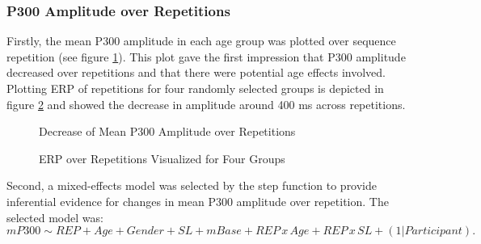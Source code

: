 \subsubsection{P300 Amplitude over Repetitions}
Firstly, the mean P300 amplitude in each age group was plotted over sequence repetition (see figure \ref{fig:KI_LI}). This plot gave the first impression that P300 amplitude decreased over repetitions and that there were potential age effects involved. Plotting ERP of repetitions for four randomly selected groups is depicted in figure \ref{fig:erp_rep} and showed the decrease in amplitude around 400 ms across repetitions. 
\begin{figure}[H]
    \centering  
       
    \caption{Decrease of Mean P300 Amplitude over Repetitions}
    \label{fig:KI_LI}
\end{figure}
\begin{figure}[H]
    \centering
       
    \caption{ERP over Repetitions Visualized for Four Groups}
    \label{fig:erp_rep}
\end{figure}

Second, a mixed-effects model was selected by the step function to provide inferential evidence for changes in mean P300 amplitude over repetition. The selected model was: 
\begin{equation}\label{eq:mP3002}
mP300 \sim REP + Age + Gender + SL  + mBase + REP \,x\, Age + REP 
\,x \,SL + (1 | Participant).
\end{equation}


